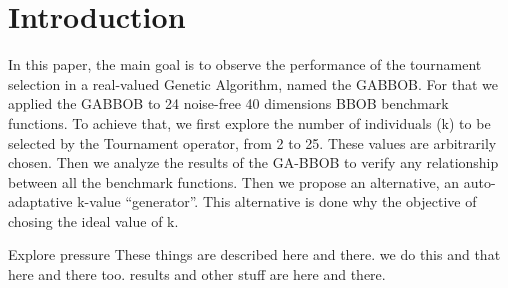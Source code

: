 \section{Introduction}\label{intro}



 In this paper, the main goal is to observe the performance of the tournament selection in a real-valued Genetic Algorithm, named the GABBOB. For that we applied the GABBOB to 24 noise-free 40 dimensions BBOB benchmark functions. To achieve that, we first explore the number of individuals (k) to be selected by the Tournament operator, from 2 to 25. These values are arbitrarily chosen. Then we analyze the results of the GA-BBOB to verify any relationship between all the benchmark functions. Then we propose an alternative, an auto-adaptative k-value ``generator''. This alternative is done why the objective of chosing the ideal value of k.

Explore pressure
These things are described here and there. we do this and that here and there too. results and other stuff are here and there.
